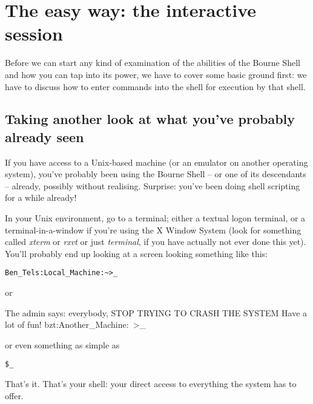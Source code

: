 \section{The easy way: the interactive session}
Before we can start any kind of examination of the abilities of the Bourne
Shell and how you can tap into its power, we have to cover some basic ground
first: we have to discuss how to enter commands into the shell for execution by
that shell.

\subsection{Taking another look at what you've probably already seen}
If you have access to a Unix-based machine (or an emulator on another operating
system), you've probably been using the Bourne Shell -- or one of its
descendants -- already, possibly without realising. Surprise: you've been doing
shell scripting for a while already!

In your Unix environment, go to a terminal; either a textual logon terminal, or
a terminal-in-a-window if you're using the X Window System (look for something
called \textit{xterm} or \textit{rxvt} or just \textit{terminal}, if you have
actually not ever done this yet). You'll probably end up looking at a screen
looking something like this:
\scriptsize
\begin{verbatim}
Ben_Tels:Local_Machine:~>_
\end{verbatim}
\normalsize
or
 
The admin says: everybody, STOP TRYING TO CRASH THE SYSTEM Have a lot of fun!
bzt:Another\_Machine:~>\_

or even something as simple as
\scriptsize
\begin{verbatim}
$_
\end{verbatim}
\normalsize

That's it. That's your shell: your direct access to everything the system has
to offer.

